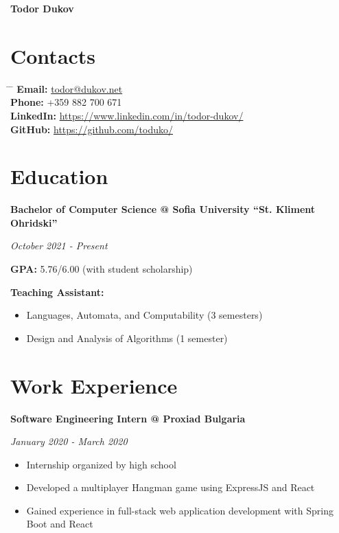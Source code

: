 \documentclass[a4paper,10pt]{article}
\begin{document}
\begin{center}
    \huge{\textbf{Todor Dukov}}
\end{center}

\section*{Contacts}

\begin{tabbing}
    \hspace{4cm} \= \hspace{8cm} \= \kill
    \textbf{Email:} \> \href{mailto:todor@dukov.net}{todor@dukov.net} \\
    \textbf{Phone:} \> +359 882 700 671 \\
    \textbf{LinkedIn:} \> \href{https://www.linkedin.com/in/todor-dukov/}{https://www.linkedin.com/in/todor-dukov/} \\
    \textbf{GitHub:} \> \href{https://github.com/toduko/}{https://github.com/toduko/} \\
\end{tabbing}

\section*{Education}

\textbf{Bachelor of Computer Science @ Sofia University “St. Kliment Ohridski”}

\textit{October 2021 - Present}

\textbf{GPA:} 5.76/6.00 (with student scholarship)

\textbf{Teaching Assistant:}
\begin{itemize}
    \item Languages, Automata, and Computability (3 semesters)
    \item Design and Analysis of Algorithms (1 semester)
\end{itemize}

\section*{Work Experience}

\textbf{Software Engineering Intern @ Proxiad Bulgaria}

\textit{January 2020 - March 2020}
\begin{itemize}
    \item Internship organized by high school
    \item Developed a multiplayer Hangman game using ExpressJS and React
    \item Gained experience in full-stack web application development with Spring Boot and React
\end{itemize}
\end{document}
